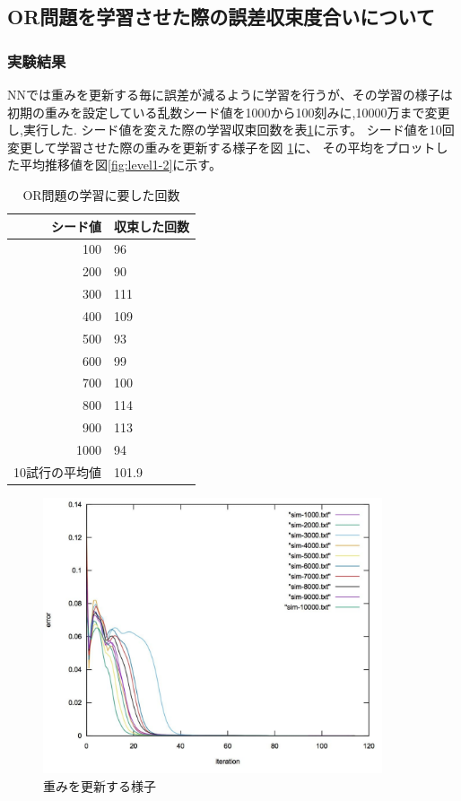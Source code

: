 \subsection{OR問題を学習させた際の誤差収束度合いについて}
\subsubsection{実験結果}
NNでは重みを更新する毎に誤差が減るように学習を行うが、その学習の様子は初期の重みを設定している乱数シード値を1000から100刻みに,10000万まで変更し,実行した.
シード値を変えた際の学習収束回数を表\ref{table:level1}に示す。
シード値を10回変更して学習させた際の重みを更新する様子を図
\ref{fig:level1-1}に、
その平均をプロットした平均推移値を図\ref{fig:level1-2}に示す。


\begin{table}[htb]
 \begin{center}
  \caption{OR問題の学習に要した回数}
  \label{table:level1}
  \begin{tabular}[htb]{r|l} \hline
   シード値 & 収束した回数 \\ \hline \hline
   100 & 96 \\ \hline
   200 & 90 \\ \hline
   300 & 111 \\ \hline
   400 & 109 \\ \hline
   500 & 93 \\ \hline
   600 & 99 \\ \hline
   700 & 100 \\ \hline
   800 & 114 \\ \hline
   900 & 113 \\ \hline
   1000 & 94 \\ \hline \hline
   10試行の平均値 & 101.9 \\ \hline
  \end{tabular}
 \end{center}
\end{table}




\begin{figure}[h]
 \begin{center}
  \includegraphics[width=10.0cm]{figs/seeds.pdf}
  \caption{重みを更新する様子}
  \label{fig:level1-1}
 \end{center}
\end{figure}

